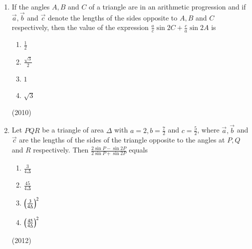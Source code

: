 \begin{enumerate}[label=\thesubsection.\arabic*,ref=\thesubsection.\theenumi]
\item If the angles $A, B$ and $C$ of a triangle are in an arithmetic progression and if $\vec{a}, \vec{b}$ and $\vec{c}$ denote the lengths of the sides opposite to $A, B$ and $C$ respectively, then the value of the expression $\frac{a}{c}\sin 2C + \frac{c}{a} \sin 2A$ is
\begin{enumerate}
\item $\frac{1}{2}$
\item $\frac{\sqrt{3}}{2}$
\item $1$
\item $\sqrt{3}$
\end{enumerate}
\hfill (2010)

\item Let $PQR$ be a triangle of area $\Delta$ with $a=2, b= \frac{7}{2}$ and $c=\frac{5}{2}$, where $\vec{a}, \vec{b}$ and $\vec{c}$ are the lengths of the sides of the triangle opposite to the angles at $P, Q$ and $R$ respectively. Then $\frac{2\sin P - \sin 2P}{2\sin P + \sin 2P}$ equals
\begin{enumerate}
\item $\frac{3}{4\Delta}$
\item $\frac{45}{4\Delta}$
\item $\left(\frac{3}{4\Delta}\right)^2$
\item $\left(\frac{45}{4\Delta}\right)^2$
\end{enumerate}
\hfill (2012)


\end{enumerate}
